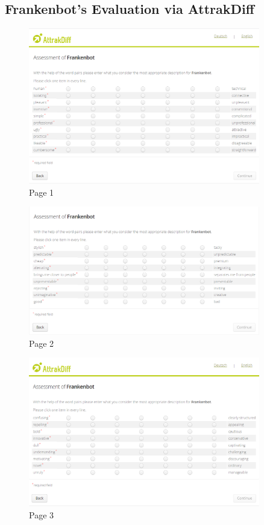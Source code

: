 \begin{appendix}
\subsection{Frankenbot's Evaluation via AttrakDiff\label{appen:attrsurvey}}
\begin{figure}[!h]
    \centering
    \includegraphics[width=0.9\textwidth]{img/AttrakDiff_Survey_1.PNG}
    \caption{Page 1 \cite{attrakdiff}}
    \label{fig:attr1}
\end{figure}

\begin{figure}[!h]
    \centering
    \includegraphics[width=0.9\textwidth]{img/AttrakDiff_Survey_2.PNG}
    \caption{Page 2 \cite{attrakdiff}}
    \label{fig:attr2}
\end{figure}

\begin{figure}[!h]
    \centering
    \includegraphics[width=0.9\textwidth]{img/AttrakDiff_Survey_3.PNG}
    \caption{Page 3 \cite{attrakdiff}}
    \label{fig:attr3}
\end{figure}


\end{appendix}
